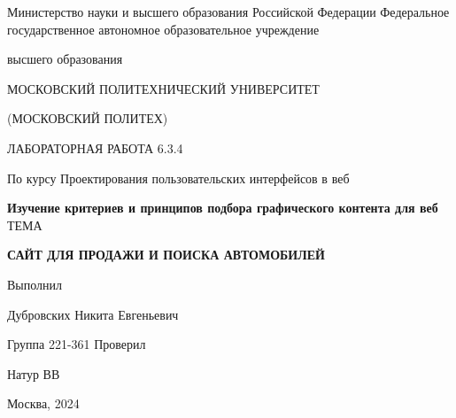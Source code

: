 \singlespacing

\newpage
\begin{center}
    Министерство науки и высшего образования Российской Федерации
    Федеральное государственное автономное образовательное учреждение

    высшего образования

    \guillemotleft МОСКОВСКИЙ ПОЛИТЕХНИЧЕСКИЙ УНИВЕРСИТЕТ\guillemotright

    (МОСКОВСКИЙ ПОЛИТЕХ)
\end{center}
\noindent
\bigbreak
\bigbreak
\bigbreak
\bigbreak
\begin{center}
    ЛАБОРАТОРНАЯ РАБОТА 6.3.4

    По курсу Проектирования пользовательских интерфейсов в веб

    \textbf{Изучение критериев и принципов подбора графического контента для веб}
    \bigbreak
    \bigbreak
    \bigbreak
    \bigbreak
    ТЕМА

    \guillemotleft\textbf{САЙТ ДЛЯ ПРОДАЖИ И ПОИСКА АВТОМОБИЛЕЙ}\guillemotright
\end{center}
\noindent
\bigbreak
\bigbreak
\bigbreak
\bigbreak
\bigbreak
\bigbreak
\bigbreak
\bigbreak
\bigbreak
\bigbreak
\hfill Выполнил

\hfill Дубровских Никита Евгеньевич

\hfill Группа 221-361
\bigbreak
\bigbreak
\bigbreak
\hfill Проверил

\hfill Натур ВВ
\vfill
\begin{center}
    Москва, 2024
\end{center}
\newpage
\onehalfspacing
